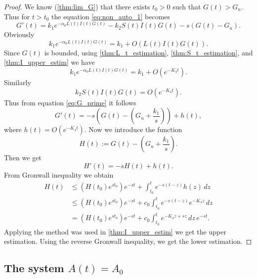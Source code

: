 \documentclass[pdflatex,sn-mathphys-num]{sn-jnl}
\theoremstyle{thmstyleone}
\theoremstyle{thmstyletwo}
\theoremstyle{thmstylethree}
\begin{document}
\begin{proof}

We know (\autoref{thm:lim_G}) that there exists $t_0>0$ such that $G(t)>G_u$. Thus for $t>t_0$ 
the equation \eqref{eq:non_auto_1} becomes 
\begin{equation}\label{eq:G_prime}
G'(t)=k_1 e^{-\alpha_0 L(t)I(t) G(t)}-k_2 S(t)I(t)G(t)-s(G(t)-G_u).
\end{equation}
Obviously
\begin{equation}
k_1 e^{-\alpha_0 L(t)I(t) G(t)}=k_1+O\left( L(t)I(t)G(t) \right).
\end{equation}
Since $G(t)$ is bounded, using \autoref{thm:L_t_estimation}, \autoref{thm:S_t_estimation}, and 
\autoref{thm:I_upper_estim} we have
\begin{equation}
k_1 e^{-\alpha_0 L(t)I(t) G(t)}=k_1+O\left( e^{-K_4 t}\right).
\end{equation}
Similarly
\begin{equation}
k_2 S(t)I(t)G(t)=O\left( e^{-K_4 t}\right).
\end{equation}
Thus from equation \eqref{eq:G_prime} it follows
\begin{equation}
G'(t)=-s\left(G(t)- \left( G_u+\frac{k_1}{s} \right) \right)+h(t),
\end{equation}
where $h(t)=O\left( e^{-K_4 t}\right)$.
Now we introduce the function 
\begin{equation}
H(t):=G(t)-\left( G_u+\frac{k_1}{s} \right).
\end{equation}
Then we get
\begin{equation}
H'(t)=-sH(t)+h(t). 
\end{equation}
From Gronwall inequality we obtain
\begin{align*}
H(t) &\leq \left(H(t_0)e^{st_0}  \right) e^{-st}+\int_{t_0}^t e^{-s(t-z)} h(z)\,dz \\
&\leq\left(H(t_0)e^{st_0}\right)e^{-st}+c_0\int_{t_0}^t e^{-s(t-z)} e^{-K_4 z} \,dz \\
&=\left(H(t_0)e^{st_0}\right)e^{-st}+c_0\int_{t_0}^t e^{-K_4 z+sz}  \,dz\, e^{-st}.
\end{align*}
Applying the method was used in \autoref{thm:I_upper_estim} we get the upper estimation. 
Using the reverse Gronwall inequality, we get the lower estimation. 
\end{proof}

\subsection{\texorpdfstring{The system $A(t)=A_0$}{The system A(t)=A0}}
\end{document}
